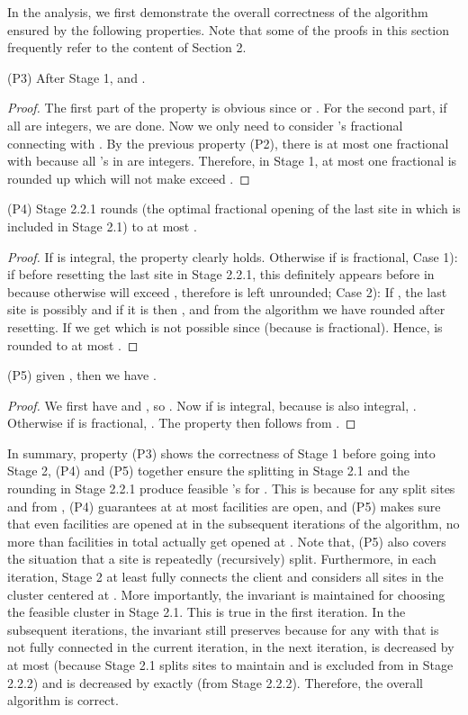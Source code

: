 \documentclass[10pt]{llncs}
\begin{document}
In the analysis, we first demonstrate the overall correctness of the
algorithm ensured by the following properties. Note that some of the
proofs in this section frequently refer to the content of Section
2.

\medskip{}


(P3) After Stage 1, 
 and .
\begin{proof}
The first part of the property is obvious since  or .
For the second part,  if all 
are integers, we are done. Now we only need to consider 's fractional
 connecting with . By the previous
property (P2), there is at most one fractional  with
 because all 's in  are integers.
Therefore, in Stage 1, at most one fractional  is rounded
up which will not make  exceed .
\end{proof}


(P4) Stage 2.2.1 rounds  (the optimal fractional opening
of the last site  in  which is included in Stage
2.1) to at most . 
\begin{proof}
If  is integral, the property clearly holds. Otherwise
if  is fractional, Case 1): if \textbf{
}before resetting the last site  in Stage 2.2.1, this  definitely
appears before  in  because otherwise 
will exceed , therefore  is left unrounded;
Case 2): If \textbf{},
the last site  is possibly  and if it is then ,
and from the algorithm we have rounded 
after resetting. If 
we get 
which is not possible since 
(because  is fractional). Hence, 
is rounded to at most .
\end{proof}


(P5)  given ,
then we have .
\begin{proof}
We first have 
and , so
.
Now if  is integral, because 
is also integral, .
Otherwise if  is fractional, .
The property then follows from .
\end{proof}
\medskip{}


In summary, property (P3) shows the correctness of Stage 1 before
going into Stage 2, (P4) and (P5) together ensure the splitting in
Stage 2.1 and the rounding in Stage 2.2.1 produce feasible 's
for . This is because for any split sites  and 
from , (P4) guarantees at  at most 
facilities are open, and (P5) makes sure that even 
facilities are opened at  in the subsequent iterations of
the algorithm, no more than  facilities in total actually
get opened at . Note that, (P5) also covers the situation that
a site is repeatedly (recursively) split. Furthermore, in each iteration,
Stage 2 at least fully connects the client  and considers
all sites in the cluster  centered at . More
importantly, the invariant 
is maintained for choosing the feasible cluster  in
Stage 2.1. This is true in the first iteration. In the subsequent
iterations, the invariant still preserves because for any  with
 that is not fully connected
in the current iteration, in the next iteration, 
is decreased by at most  (because Stage 2.1 splits
sites to maintain 
and  is excluded from  in Stage 2.2.2)
and  is decreased by exactly  (from
Stage 2.2.2). Therefore, the overall algorithm is correct.
\end{document}
